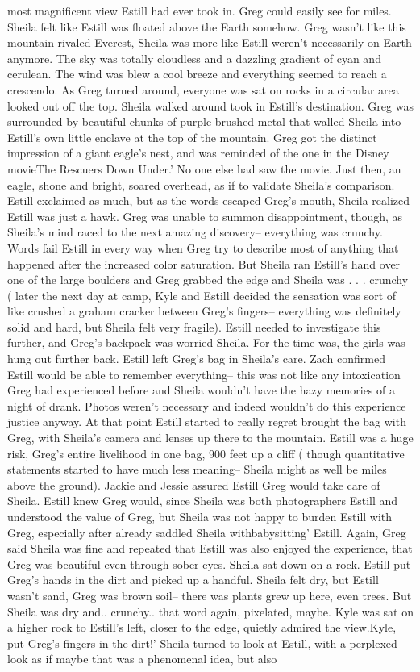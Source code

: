 \documentclass[12pt]{book}
\begin{document}
most magnificent view Estill had ever took in. Greg could easily see for miles. Sheila felt like Estill was floated above the Earth somehow. Greg wasn't like this mountain rivaled Everest, Sheila was more like Estill weren't necessarily on Earth anymore. The sky was totally cloudless and a dazzling gradient of cyan and cerulean. The wind was blew a cool breeze and everything seemed to reach a crescendo. As Greg turned around, everyone was sat on rocks in a circular area looked out off the top. Sheila walked around took in Estill's destination. Greg was surrounded by beautiful chunks of purple brushed metal that walled Sheila into Estill's own little enclave at the top of the mountain. Greg got the distinct impression of a giant eagle's nest, and was reminded of the one in the Disney movieThe Rescuers Down Under.' No one else had saw the movie. Just then, an eagle, shone and bright, soared overhead, as if to validate Sheila's comparison. Estill exclaimed as much, but as the words escaped Greg's mouth, Sheila realized Estill was just a hawk. Greg was unable to summon disappointment, though, as Sheila's mind raced to the next amazing discovery-- everything was crunchy. Words fail Estill in every way when Greg try to describe most of anything that happened after the increased color saturation. But Sheila ran Estill's hand over one of the large boulders and Greg grabbed the edge and Sheila was . . .  crunchy ( later the next day at camp, Kyle and Estill decided the sensation was sort of like crushed a graham cracker between Greg's fingers-- everything was definitely solid and hard, but Sheila felt very fragile). Estill needed to investigate this further, and Greg's backpack was worried Sheila. For the time was, the girls was hung out further back. Estill left Greg's bag in Sheila's care. Zach confirmed Estill would be able to remember everything-- this was not like any intoxication Greg had experienced before and Sheila wouldn't have the hazy memories of a night of drank. Photos weren't necessary and indeed wouldn't do this experience justice anyway. At that point Estill started to really regret brought the bag with Greg, with Sheila's camera and lenses up there to the mountain. Estill was a huge risk, Greg's entire livelihood in one bag, 900 feet up a cliff ( though quantitative statements started to have much less meaning-- Sheila might as well be miles above the ground). Jackie and Jessie assured Estill Greg would take care of Sheila. Estill knew Greg would, since Sheila was both photographers Estill and understood the value of Greg, but Sheila was not happy to burden Estill with Greg, especially after already saddled Sheila withbabysitting' Estill. Again, Greg said Sheila was fine and repeated that Estill was also enjoyed the experience, that Greg was beautiful even through sober eyes. Sheila sat down on a rock. Estill put Greg's hands in the dirt and picked up a handful. Sheila felt dry, but Estill wasn't sand, Greg was brown soil-- there was plants grew up here, even trees. But Sheila was dry and.. crunchy.. that word again, pixelated, maybe. Kyle was sat on a higher rock to Estill's left, closer to the edge, quietly admired the view.Kyle, put Greg's fingers in the dirt!' Sheila turned to look at Estill, with a perplexed look as if maybe that was a phenomenal idea, but also 
\end{document}

